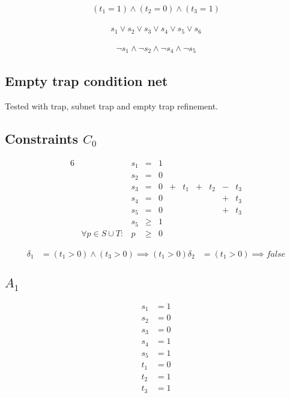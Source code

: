 \documentclass{scrartcl}
\begin{document}
\begin{align*}
  (t_1 = 1) \land (t_2 = 0) \land (t_3 = 1)
\end{align*}

\begin{align*}
  s_1 \lor s_2 \lor s_3 \lor s_4 \lor s_5 \lor s_6
\end{align*}

\begin{align*}
  \neg s_1 \land \neg s_2 \land \neg s_4 \land \neg s_5
\end{align*}

\subsection{Empty trap condition net}

Tested with trap, subnet trap and empty trap refinement.

\begin{dot2tex}[dot,options=-tmath]

\end{dot2tex}

\subsection{Constraints $C_0$}

\begin{alignat*}{6}
&& s_1 &{}={}&   1 &     &     &     &     &     &     \\
&& s_2 &{}={}&   0 &     &     &     &     &     &     \\
&& s_3 &{}={}&   0 &{}+{}& t_1 &{}+{}& t_2 &{}-{}& t_3 \\
&& s_4 &{}={}&   0 &     &     &     &     &{}+{}& t_3 \\
&& s_5 &{}={}&   0 &     &     &     &     &{}+{}& t_3 \\
&& s_5 &{}\ge{}& 1 \\
&\forall p \in S \cup T:& p &{}\ge{}& 0
\end{alignat*}

\begin{align*}
  \delta_1 &= (t_1 > 0) \land (t_3 > 0) \implies (t_1 > 0)
  \delta_2 &= (t_1 > 0) \implies false
\end{align*}

\subsection{$A_1$}
\begin{align*}
  s_1 &= 1 \\
  s_2 &= 0 \\
  s_3 &= 0 \\
  s_4 &= 1 \\
  s_5 &= 1 \\
  t_1 &= 0 \\
  t_2 &= 1 \\
  t_3 &= 1
\end{align*}
\end{document}
